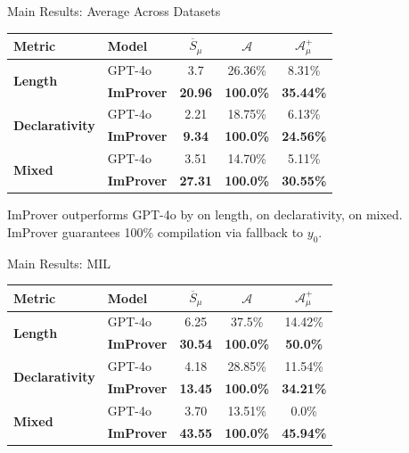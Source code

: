 \begin{frame}{Main Results: Average Across Datasets}
\vspace{0.3em}
\begin{center}
\small
\begin{tabular}{ll|ccc}
\toprule
Metric & Model & $\overline{S}_\mu$ & $\mathcal{A}$ & $\mathcal{A}^+_\mu$\\
\midrule
\multirow{2}{*}{\textbf{Length}} & GPT-4o & 3.7 & 26.36\% & 8.31\%\\
& \textbf{ImProver} & \textbf{20.96} & \textbf{100.0\%} & \textbf{35.44\%}\\
\midrule
\multirow{2}{*}{\textbf{Declarativity}} & GPT-4o & 2.21 & 18.75\% & 6.13\%\\
& \textbf{ImProver} & \textbf{9.34} & \textbf{100.0\%} & \textbf{24.56\%}\\
\midrule
\multirow{2}{*}{\textbf{Mixed}} & GPT-4o & 3.51 & 14.70\% & 5.11\%\\
& \textbf{ImProver} & \textbf{27.31} & \textbf{100.0\%} & \textbf{30.55\%}\\
\bottomrule
\end{tabular}
\end{center}
\vspace{0.4em}
\small ImProver outperforms GPT-4o by  on length,  on declarativity,  on mixed.\\
ImProver guarantees 100\% compilation via fallback to $y_0$.
\end{frame}

\begin{frame}{Main Results: MIL}
\vspace{0.3em}
\begin{center}
\small
\begin{tabular}{ll|ccc}
\toprule
Metric & Model & $\overline{S}_\mu$ & $\mathcal{A}$ & $\mathcal{A}^+_\mu$\\
\midrule
\multirow{2}{*}{\textbf{Length}} & GPT-4o & 6.25 & 37.5\% & 14.42\%\\
& \textbf{ImProver} & \textbf{30.54} & \textbf{100.0\%} & \textbf{50.0\%}\\
\midrule
\multirow{2}{*}{\textbf{Declarativity}} & GPT-4o & 4.18 & 28.85\% & 11.54\%\\
& \textbf{ImProver} & \textbf{13.45} & \textbf{100.0\%} & \textbf{34.21\%}\\
\midrule
\multirow{2}{*}{\textbf{Mixed}} & GPT-4o & 3.70 & 13.51\% & 0.0\%\\
& \textbf{ImProver} & \textbf{43.55} & \textbf{100.0\%} & \textbf{45.94\%}\\
\bottomrule
\end{tabular}
\end{center}
\end{frame}

